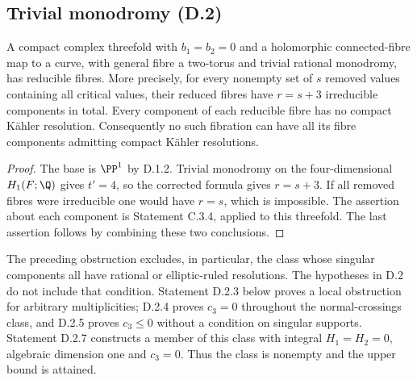 \subsection{Trivial monodromy (D.2)}

\begin{proposition}\label{st:D.2.1}
A compact complex threefold with $b_1=b_2=0$ and a holomorphic
connected-fibre map to a curve, with general fibre a two-torus and
trivial rational monodromy, has reducible fibres. More precisely,
for every nonempty set of $s$ removed values containing all critical
values, their reduced fibres have $r=s+3$ irreducible components in
total. Every component of each reducible fibre has no compact
K\"ahler resolution. Consequently no such fibration can have all
its fibre components admitting compact K\"ahler resolutions.
\end{proposition}
\begin{proof}
The base is $\PP^1$ by D.1.2. Trivial monodromy on the
four-dimensional $H_1(F;\Q)$ gives $t'=4$, so the corrected formula
gives $r=s+3$. If all removed fibres were irreducible one would have
$r=s$, which is impossible. The assertion about each component is
Statement C.3.4, applied to this threefold. The last assertion follows
by combining these two conclusions.
\end{proof}

\begin{remark}\label{st:D.2.2}
The preceding obstruction excludes, in particular, the class whose
singular components all have rational or elliptic-ruled resolutions.
The hypotheses in D.2 do not include that condition. Statement
D.2.3 below proves a local obstruction for arbitrary multiplicities;
D.2.4 proves $c_3=0$ throughout the normal-crossings class, and
D.2.5 proves $c_3\le0$ without a condition on singular supports.
Statement D.2.7 constructs a member of this class with
integral $H_1=H_2=0$, algebraic dimension one and $c_3=0$.
Thus the class is nonempty and the upper bound is attained.
\end{remark}

